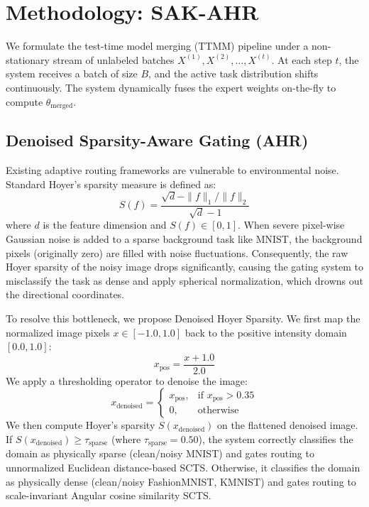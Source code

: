 \documentclass{article}
\theoremstyle{plain}
\theoremstyle{definition}
\theoremstyle{remark}
\begin{document}
\section{Methodology: SAK-AHR}
\label{sec:method}

We formulate the test-time model merging (TTMM) pipeline under a non-stationary stream of unlabeled batches $X^{(1)}, X^{(2)}, \dots, X^{(t)}$. At each step $t$, the system receives a batch of size $B$, and the active task distribution shifts continuously. The system dynamically fuses the expert weights on-the-fly to compute $\theta_{\text{merged}}$.

\subsection{Denoised Sparsity-Aware Gating (AHR)}
Existing adaptive routing frameworks are vulnerable to environmental noise. Standard Hoyer's sparsity measure \citep{hoyer2004hoyer} is defined as:
\begin{equation}
S(f) = \frac{\sqrt{d} - \|f\|_1/\|f\|_2}{\sqrt{d} - 1}
\end{equation}
where $d$ is the feature dimension and $S(f) \in [0, 1]$. When severe pixel-wise Gaussian noise is added to a sparse background task like MNIST, the background pixels (originally zero) are filled with noise fluctuations. Consequently, the raw Hoyer sparsity of the noisy image drops significantly, causing the gating system to misclassify the task as dense and apply spherical normalization, which drowns out the directional coordinates.

To resolve this bottleneck, we propose Denoised Hoyer Sparsity. We first map the normalized image pixels $x \in [-1.0, 1.0]$ back to the positive intensity domain $[0.0, 1.0]$:
\begin{equation}
x_{\text{pos}} = \frac{x + 1.0}{2.0}
\end{equation}
We apply a thresholding operator to denoise the image:
\begin{equation}
x_{\text{denoised}} = \begin{cases}
x_{\text{pos}}, & \text{if } x_{\text{pos}} > 0.35 \\
0, & \text{otherwise}
\end{cases}
\end{equation}
We then compute Hoyer's sparsity $S(x_{\text{denoised}})$ on the flattened denoised image. If $S(x_{\text{denoised}}) \ge \tau_{\text{sparse}}$ (where $\tau_{\text{sparse}} = 0.50$), the system correctly classifies the domain as physically sparse (clean/noisy MNIST) and gates routing to unnormalized Euclidean distance-based SCTS. Otherwise, it classifies the domain as physically dense (clean/noisy FashionMNIST, KMNIST) and gates routing to scale-invariant Angular cosine similarity SCTS.
\end{document}
